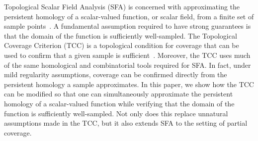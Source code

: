 Topological Scalar Field Analysis (SFA) is concerned with approximating the persistent homology of a scalar-valued function, or scalar field, from a finite set of sample points~\cite{chazal09analysis,buchet15topological}.
A fundamental assumption required to have strong guarantees is that the domain of the function is sufficiently well-sampled.
The Topological Coverage Criterion (TCC) is a topological condition for coverage that can be used to confirm that a given sample is sufficient~\cite{desilva06coordinate,desilva07coverage,desilva07homological,cavanna2017when}.
Moreover, the TCC uses much of the same homological and combinatorial tools required for SFA.
In fact, under mild regularity assumptions, coverage can be confirmed directly from the persistent homology a sample approximates.
In this paper, we show how the TCC can be modified so that one can simultaneously approximate the persistent homology of a scalar-valued function while verifying that the domain of the function is sufficiently well-sampled.
Not only does this replace unnatural assumptions made in the TCC, but it also extends SFA to the setting of partial coverage.


